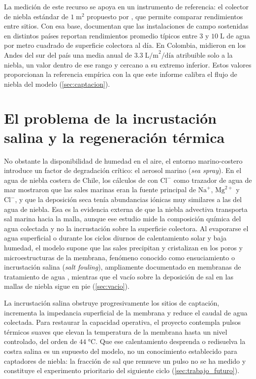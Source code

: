 La medici\'on de este recurso se apoya en un instrumento de referencia: el colector de niebla est\'andar de $1\;\text{m}^2$ propuesto por \textcite{schemenauer1994standard}, que permite comparar rendimientos entre sitios. Con esa base, \textcite{klemm2012fog} documentan que las instalaciones de campo sostenidas en distintos pa\'ises reportan rendimientos promedio t\'ipicos entre $3$ y $10\;\text{L}$ de agua por metro cuadrado de superficie colectora al d\'ia. En Colombia, \textcite{molina2008fog} midieron en los Andes del sur del pa\'is una media anual de $3.3\;\text{L/m}^2\text{/d\'ia}$ atribuible solo a la niebla, un valor dentro de ese rango y cercano a su extremo inferior. Estos valores proporcionan la referencia emp\'irica con la que este informe calibra el flujo de niebla del modelo (\cref{sec:captacion}).

\section{El problema de la incrustaci\'on salina y la regeneraci\'on t\'ermica}
No obstante la disponibilidad de humedad en el aire, el entorno marino-costero introduce un factor de degradaci\'on cr\'itico: el aerosol marino (\emph{sea spray}). En el agua de niebla costera de Chile, los c\'alculos de \textcite{schemenauer1992quality} con $\text{Cl}^-$ como trazador de agua de mar mostraron que las sales marinas eran la fuente principal de $\text{Na}^+$, $\text{Mg}^{2+}$ y $\text{Cl}^-$, y que la deposici\'on seca ten\'ia abundancias i\'onicas muy similares a las del agua de niebla. Esa es la evidencia externa de que la niebla advectiva transporta sal marina hacia la malla, aunque ese estudio mide la composici\'on qu\'imica del agua colectada y no la incrustaci\'on sobre la superficie colectora. Al evaporarse el agua superficial o durante los ciclos diurnos de calentamiento solar y baja humedad, el modelo supone que las sales precipitan y cristalizan en los poros y microestructuras de la membrana, fen\'omeno conocido como ensuciamiento o incrustaci\'on salina (\emph{salt fouling}), ampliamente documentado en membranas de tratamiento de agua \parencite{antony2011scale}, mientras que el vac\'io sobre la deposici\'on de sal en las mallas de niebla sigue en pie (\cref{sec:vacio}).

La incrustaci\'on salina obstruye progresivamente los sitios de captaci\'on, incrementa la impedancia superficial de la membrana y reduce el caudal de agua colectada. Para restaurar la capacidad operativa, el proyecto contempla pulsos t\'ermicos suaves que elevan la temperatura de la membrana hasta un nivel controlado, del orden de $44\;\si{\celsius}$. Que ese calentamiento desprenda o redisuelva la costra salina es un supuesto del modelo, no un conocimiento establecido para captadores de niebla: la fracci\'on de sal que remueve un pulso no se ha medido y constituye el experimento prioritario del siguiente ciclo (\cref{sec:trabajo_futuro}).

